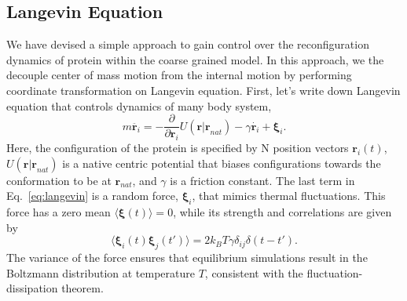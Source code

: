 \documentclass[../talant.diss.submit.tex]{subfiles}
\begin{document}
\subsection{\textbf{Langevin Equation}}\label{subsect:le}
We have devised a simple approach to gain control over the reconfiguration dynamics of protein within
the coarse grained model. 
In this approach, we the decouple center of mass motion from the internal motion by performing coordinate
transformation on Langevin equation. First, let's write down Langevin equation that controls
dynamics of many body system,
%
%
\begin{equation}
  \label{eq:langevin}
  m\ddot{\bm{r}_i} = -\frac{ \partial}{\partial{\bm{r}_i}} U(\bm{r|r}_{nat}) -
  \gamma \dot{\bm{r}_i} + \bm{\xi}_i.
\end{equation}
Here, the configuration of the protein is specified by N position vectors
${\bm{r}_i(t)}$, $U(\bm{r|r}_{nat})$ is
a native centric potential that biases configurations towards the conformation
to be at ${\bm{r}_{nat}}$, and $\gamma$ is a friction
constant. The last term in Eq.~\ref{eq:langevin} is a random force, $\bm{\xi}_i$,
that mimics thermal fluctuations.
This force has a zero mean
$\langle \bm{\xi}(t)\rangle = 0$, while its strength and correlations are given by
%
%
\begin{equation}
  \label{eq:rand_force_def}
    \langle \bm{\xi}_i(t) \bm{\xi}_j(t')\rangle = 2k_B T\gamma \delta_{ij} \delta(t-t').
\end{equation}
%
The variance of the force ensures that  equilibrium
simulations result in the Boltzmann distribution at temperature $T$,
consistent with the fluctuation-dissipation theorem.
\end{document}
